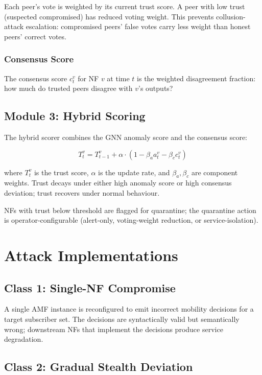 \documentclass[sigconf,nonacm]{acmart}
\begin{document}
Each peer's vote is weighted by its current trust score. A
peer with low trust (suspected compromised) has reduced voting
weight. This prevents collusion-attack escalation: compromised
peers' false votes carry less weight than honest peers'
correct votes.

\subsubsection{Consensus Score}

The consensus score $c_t^v$ for NF $v$ at time $t$ is the
weighted disagreement fraction: how much do trusted peers
disagree with $v$'s outputs?

\subsection{Module 3: Hybrid Scoring}

The hybrid scorer combines the GNN anomaly score and the consensus
score:

\begin{equation}
  T_t^v = T_{t-1}^v + \alpha \cdot (1 - \beta_a a_t^v - \beta_c c_t^v)
\end{equation}

where $T_t^v$ is the trust score, $\alpha$ is the update rate,
and $\beta_a, \beta_c$ are component weights. Trust decays under
either high anomaly score or high consensus deviation; trust
recovers under normal behaviour.

NFs with trust below threshold are flagged for quarantine; the
quarantine action is operator-configurable (alert-only,
voting-weight reduction, or service-isolation).

\section{Attack Implementations}

\subsection{Class 1: Single-NF Compromise}

A single AMF instance is reconfigured to emit incorrect mobility
decisions for a target subscriber set. The decisions are
syntactically valid but semantically wrong; downstream NFs that
implement the decisions produce service degradation.

\subsection{Class 2: Gradual Stealth Deviation}
\end{document}
